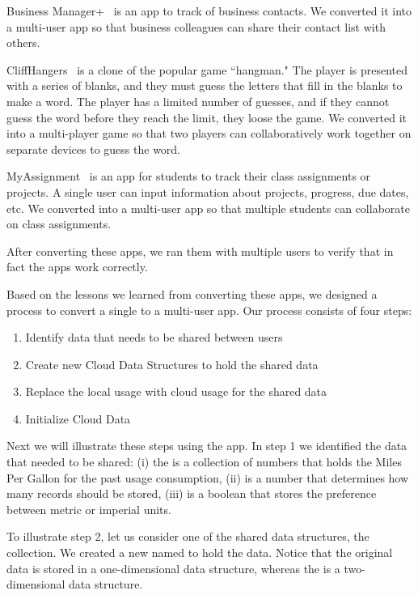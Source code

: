 \documentclass{sigplanconf}
\begin{document}
Business Manager+~\cite{BusinessManager} is an app to track of business contacts.  We converted it into a multi-user app so that business colleagues can share their contact list with others.

CliffHangers~\cite{CliffHangers} is a clone of the popular game ``hangman."  The player is presented with a series of blanks, and they must guess the letters that fill in the blanks to make a word.  The player has a limited number of guesses, and if they cannot guess the word before they reach the limit, they loose the game.  We converted it into a multi-player game so that two players can collaboratively work together on separate devices to guess the word.

MyAssignment~\cite{MyAssignments} is an app for students to track their class assignments or projects.  A single user can input information about projects, progress, due dates, etc.  We converted into a multi-user app so that multiple students can collaborate on class assignments.

After converting these apps, we ran them with multiple users to verify that in fact the apps work correctly. 

Based on the lessons we learned from converting these \numFormative apps, we designed a process to convert  a single to a multi-user app.  Our process consists of four steps:   
\begin{enumerate}
\item Identify data that needs to be shared between users

\item Create new Cloud Data Structures to hold the shared data

\item Replace the local usage with cloud usage for the shared data

\item Initialize Cloud Data
\end{enumerate}

Next we will illustrate these steps using the \MT app.  In step 1 we identified the data that needed to be shared: 
(i) the  is a collection of numbers that holds the Miles Per Gallon for the past usage consumption, 
(ii)  is a number that determines how many records should be stored, 
(iii)  is a boolean that stores the preference between metric or imperial units.
   
To illustrate step 2, let us consider one of the shared data structures, the  collection. 
We created a new  named  to hold the data. Notice that the
original data is stored in a one-dimensional data structure, whereas the  is a two-dimensional data 
structure.
\end{document}
